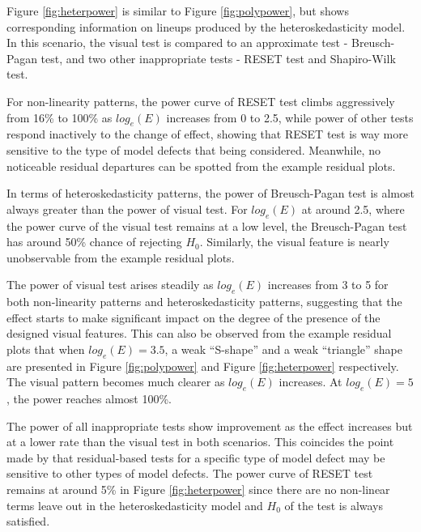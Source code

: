 \documentclass[]{interact}
\theoremstyle{plain}%
\theoremstyle{definition}
\theoremstyle{remark}
\begin{document}
Figure \ref{fig:heterpower} is similar to Figure \ref{fig:polypower},
but shows corresponding information on lineups produced by the
heteroskedasticity model. In this scenario, the visual test is compared
to an approximate test - Breusch-Pagan test, and two other inappropriate
tests - RESET test and Shapiro-Wilk test.

For non-linearity patterns, the power curve of RESET test climbs
aggressively from 16\% to 100\% as \(log_e(E)\) increases from 0 to 2.5,
while power of other tests respond inactively to the change of effect,
showing that RESET test is way more sensitive to the type of model
defects that being considered. Meanwhile, no noticeable residual
departures can be spotted from the example residual plots.

In terms of heteroskedasticity patterns, the power of Breusch-Pagan test
is almost always greater than the power of visual test. For \(log_e(E)\)
at around 2.5, where the power curve of the visual test remains at a low
level, the Breusch-Pagan test has around 50\% chance of rejecting
\(H_0\). Similarly, the visual feature is nearly unobservable from the
example residual plots.

The power of visual test arises steadily as \(log_e(E)\) increases from
3 to 5 for both non-linearity patterns and heteroskedasticity patterns,
suggesting that the effect starts to make significant impact on the
degree of the presence of the designed visual features. This can also be
observed from the example residual plots that when \(log_e(E) = 3.5\), a
weak ``S-shape'' and a weak ``triangle'' shape are presented in Figure
\ref{fig:polypower} and Figure \ref{fig:heterpower} respectively. The
visual pattern becomes much clearer as \(log_e(E)\) increases. At
\(log_e(E) = 5\), the power reaches almost 100\%.

The power of all inappropriate tests show improvement as the effect
increases but at a lower rate than the visual test in both scenarios.
This coincides the point made by \citet{cook1982residuals} that
residual-based tests for a specific type of model defect may be
sensitive to other types of model defects. The power curve of RESET test
remains at around 5\% in Figure \ref{fig:heterpower} since there are no
non-linear terms leave out in the heteroskedasticity model and \(H_0\)
of the test is always satisfied.
\end{document}
